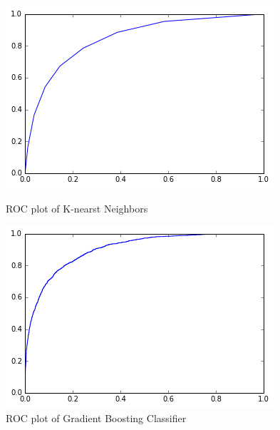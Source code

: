 \documentclass[11pt]{article}
\begin{document}
\begin{figure}[!ht]
\centering
\begin{minipage}{.5\textwidth}
  \centering
  \includegraphics[width=.8\linewidth]{knn_rocplot.png}
  \caption{ROC plot of K-nearst Neighbors}
\end{minipage}%
\begin{minipage}{.5\textwidth}
  \centering
  \includegraphics[width=.8\linewidth]{grad_rocplot.png}
  \caption{ROC plot of Gradient Boosting Classifier}
\end{minipage}%


\end{figure}
\end{document}

